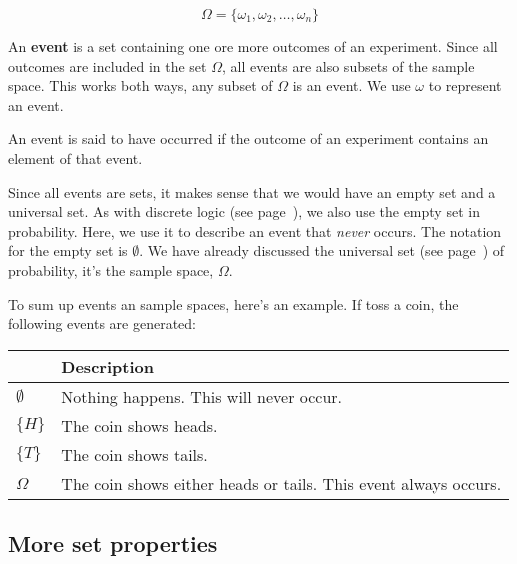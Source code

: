 \begin{dmath}
	\Omega = \{\omega_1, \omega_2, \ldots, \omega_n\}
\end{dmath}

An {\bf event} is a set containing one ore more outcomes of an experiment. Since
all outcomes are included in the set $\Omega$, all events are also subsets of
the sample space. This works both ways, any subset of $\Omega$ is an event. We
use $\omega$ to represent an event.

An event is said to have occurred if the outcome of an experiment contains an
element of that event.

Since all events are sets, it makes sense that we would have an empty set and a
universal set. As with discrete logic (see page~\pageref{subsubsec:empty_set}),
we also use the empty set in probability. Here, we use it to describe an event
that {\it never} occurs. The notation for the empty set is $\emptyset$. We have
already discussed the universal set (see page~\pageref{subsubsec:universal_set})
of probability, it's the sample space, $\Omega$.


To sum up events an sample spaces, here's an example. If toss a coin, the
following events are generated:

\begin{center}
	\begin{tabular}{|>{\centering\arraybackslash}m{1cm}|m{8cm}|}
		\hline
		{\bf Event} & {\bf Description}\\ \hline
		$\emptyset$ & Nothing happens. This will never occur.\\ \hline
		$\{H\}$     & The coin shows heads.\\ \hline
		$\{T\}$     & The coin shows tails.\\ \hline
		$\Omega$    & The coin shows either heads or tails. This event always occurs.\\
		\hline
	\end{tabular}
\end{center}


\subsection{More set properties}

